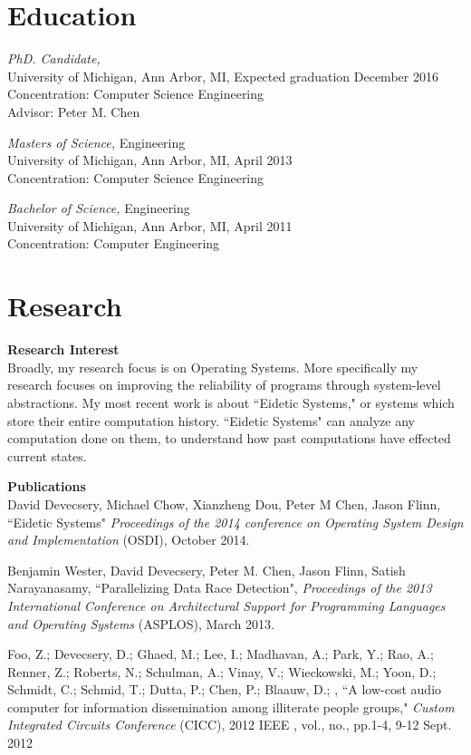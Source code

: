 \documentclass[margin, 10pt]{res} %
\begin{document}
\begin{resume}
 

\section{Education}

{\sl PhD. Candidate,} \\
University of Michigan, Ann Arbor, MI, Expected graduation December 2016 \\
Concentration: Computer Science Engineering \\
Advisor: Peter M. Chen

{\sl Masters of Science,} Engineering \\
University of Michigan, Ann Arbor, MI, April 2013 \\
Concentration: Computer Science Engineering

{\sl Bachelor of Science,} Engineering \\
University of Michigan, Ann Arbor, MI, April 2011 \\
Concentration: Computer Engineering


\section{Research}
\textbf{Research Interest}\\
Broadly, my research focus is on Operating Systems.  More specifically
my research focuses on improving the reliability of programs through
system-level abstractions.  My most recent work is about ``Eidetic
Systems," or systems which store their entire computation history.
``Eidetic Systems" can analyze any computation done on them, to
understand how past computations have effected current states.

\textbf{Publications}\\
David Devecsery, Michael Chow, Xianzheng Dou, Peter M Chen, Jason Flinn,
``Eidetic Systems" {\sl Proceedings of the 2014 conference on Operating
System Design and Implementation} (OSDI), October 2014.

Benjamin Wester, David Devecsery, Peter M. Chen, Jason Flinn, Satish
Narayanasamy, ``Parallelizing Data Race Detection", {\sl Proceedings of the
2013 International Conference on Architectural Support for Programming
Languages and Operating Systems} (ASPLOS), March 2013.

Foo, Z.; Devecsery, D.; Ghaed, M.; Lee, I.; Madhavan, A.; Park, Y.;
Rao, A.; Renner, Z.; Roberts, N.; Schulman, A.; Vinay, V.; Wieckowski,
M.; Yoon, D.; Schmidt, C.; Schmid, T.; Dutta, P.; Chen, P.; Blaauw,
D.; , ``A low-cost audio computer for information dissemination among
illiterate people groups," {\sl Custom Integrated Circuits Conference}
(CICC), 2012 IEEE , vol., no., pp.1-4, 9-12 Sept. 2012


\end{resume}
\end{document}
